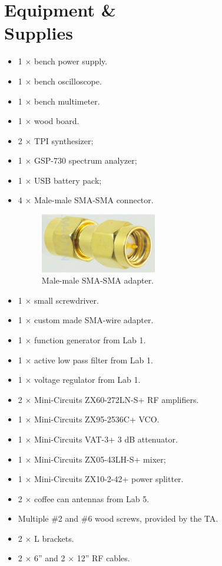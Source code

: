 \documentclass[letterpaper, 11pt]{article}
\begin{document}
\newpage
\section{Equipment \& \\Supplies}

\begin{itemize}[itemsep=0.5ex]
	\item 1 $\times$ bench power supply.
	\item 1 $\times$ bench oscilloscope.
	\item 1 $\times$ bench multimeter.
	\item 1 $\times$ wood board.
	\item 2 $\times$ TPI synthesizer;
	\item 1 $\times$ GSP-730 spectrum analyzer;
	\item 1 $\times$ USB battery pack;
	\item 4 $\times$ Male-male SMA-SMA connector. 
		\begin{figure}[h]
			\centering
			\includegraphics[width=2in]{sma-sma.png} 
			\caption{Male-male SMA-SMA adapter.}
			\label{fig:sma-sma}
		\end{figure}
	\item 1 $\times$ small screwdriver.
	\item 1 $\times$ custom made SMA-wire adapter.
	\item 1 $\times$ function generator from Lab 1.
	\item 1 $\times$ active low pass filter from Lab 1. 
	\item 1 $\times$ voltage regulator from Lab 1.
	\item 2 $\times$ Mini-Circuits ZX60-272LN-S+ RF amplifiers. 
	\item 1 $\times$ Mini-Circuits ZX95-2536C+ VCO. 
	\item 1 $\times$ Mini-Circuits VAT-3+ 3 dB attenuator. 
	\item 1 $\times$ Mini-Circuits ZX05-43LH-S+ mixer;
	\item 1 $\times$ Mini-Circuits ZX10-2-42+ power splitter. 
	\item 2 $\times$ coffee can antennas from Lab 5.
	\item Multiple \#2 and \#6 wood screws, provided by the TA. 
	\item 2 $\times$ L brackets. 
	\item 2 $\times$ 6'' and 2 $\times$ 12'' RF cables.
\end{itemize}
\end{document}
